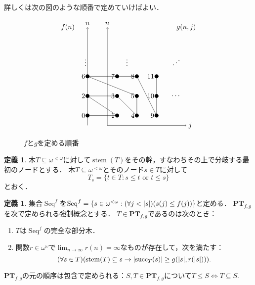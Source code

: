 \documentclass[uplatex]{jsarticle}
\newcommand{\Seq}{\operatorname{Seq}}
\newcommand{\stem}{\operatorname{stem}}
\newcommand{\suc}{\operatorname{succ}}
\newcommand{\PTfg}{\mathbf{PT}_{f,g}}
\newcommand{\OR}{\text{ or }}
\DeclarePairedDelimiter\abs{\lvert}{\rvert}
\renewcommand\subset{\subseteq}
\theoremstyle{definition}
\newtheorem{defi}[thm]{定義}
\begin{document}
	詳しくは次の図のような順番で定めていけばよい．
	\begin{figure}[h]\label{fig:ordering}
		\caption{$f$と$g$を定める順番}
	\[
	\tikz{
		\draw[->] (1, 0) -- (5, 0) node[right] {$j$};
		\draw[->] (1, 0) -- (1, 5) node[above] {$n$};
		\draw[->] (0, 0) -- (0, 5) node[above] {$n$};
		\node at (-1, 5) {$f(n)$};
		\node at (5, 5) {$g(n, j)$};
		
		\fill (0,0.5) circle (0.1) node[left] {$0$};
		\fill (1.5,0.5) circle (0.1) node[left] {$1$};
		\fill (0,1.5) circle (0.1) node[left] {$2$};
		\fill (1.5,1.5) circle (0.1) node[left] {$3$};
		\fill (2.5,0.5) circle (0.1) node[left] {$4$};
		\fill (2.5,1.5) circle (0.1) node[left] {$5$};
		\fill (0,2.5) circle (0.1) node[left] {$6$};
		\fill (1.5,2.5) circle (0.1) node[left] {$7$};
		\fill (2.5,2.5) circle (0.1) node[left] {$8$};
		\fill (3.5,0.5) circle (0.1) node[left] {$9$};
		\fill (3.5,1.5) circle (0.1) node[left] {$10$};
		\fill (3.5,2.5) circle (0.1) node[left] {$11$};
		
		\draw (0,0.5) -- (1.5,0.5) -- (0, 1.5) -- (1.5,1.5) -- (2.5,0.5) -- (2.5,1.5) -- (0,2.5) -- (1.5,2.5) -- (2.5,2.5) -- (3.5, 0.5) -- (3.5, 1.5) -- (3.5, 2.5);
		
		\node at (-0.1, 3.3) {$\vdots$};
		\node at (2, 3.3) {$\vdots$};
		\node at (4.5, 3.3) {$\reflectbox{$\ddots$}$};
		\node at (4.5, 1.5) {$\cdots$};
	}
	\]
	\end{figure}

	
	\begin{defi}
		木$T \subset \omega^{<\omega}$に対して$\stem(T)$をその幹，すなわちその上で分岐する最初のノードとする．
		木$T \subset \omega^{<\omega}$とそのノード$s \in T$に対して
		\[
		T_s = \{ t \in T : s \le t \OR t \le s \}
		\]
		とおく．
	\end{defi}
		
	\begin{defi}
		集合$\Seq^f$を$\Seq^f  = \{ s \in \omega^{<\omega} : (\forall j < \abs{s}) (s(j) \le f(j)) \}$と定める．
		$\PTfg$を次で定められる強制概念とする．
		$T \in \PTfg$であるのは次のとき：
		\begin{enumerate}
			\item $T$は$\Seq^f$の完全な部分木．
			\item 関数$r \in \omega^\omega$で$\lim_{n \to \infty} r(n) = \infty$なものが存在して，次を満たす：
			\[
			(\forall s \in T)(\stem(T) \subset s \rightarrow \abs{\suc_T(s)} \ge g(\abs{s}, r(\abs{s}))).
			\]
		\end{enumerate}
		
		$\PTfg$の元の順序は包含で定められる：$S, T \in \PTfg$について$T \le S \Leftrightarrow T \subset S$.
	\end{defi}
\end{document}
